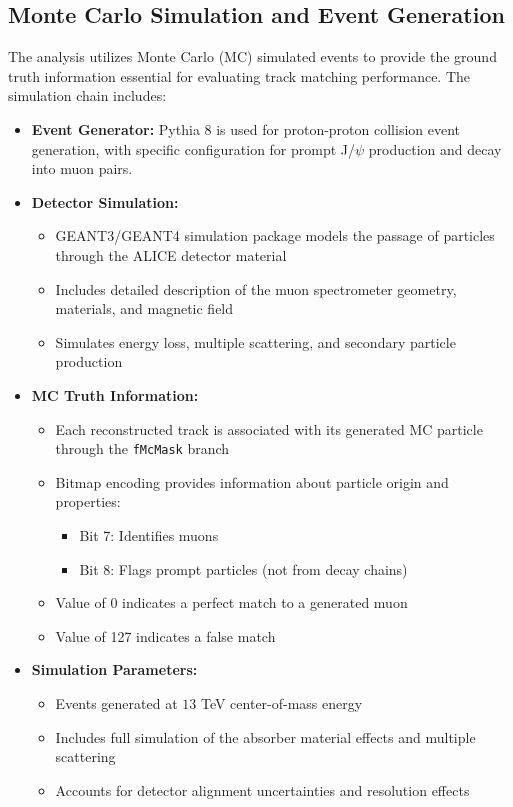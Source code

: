 \documentclass{article}
\begin{document}
\subsection{Monte Carlo Simulation and Event Generation}
The analysis utilizes Monte Carlo (MC) simulated events to provide the ground truth information essential for evaluating track matching performance. The simulation chain includes:

\begin{itemize}
    \item \textbf{Event Generator:} Pythia 8 is used for proton-proton collision event generation, with specific configuration for prompt J/$\psi$ production and decay into muon pairs.
    
    \item \textbf{Detector Simulation:}
    \begin{itemize}
        \item GEANT3/GEANT4 simulation package models the passage of particles through the ALICE detector material
        \item Includes detailed description of the muon spectrometer geometry, materials, and magnetic field
        \item Simulates energy loss, multiple scattering, and secondary particle production
    \end{itemize}
    
    \item \textbf{MC Truth Information:}
    \begin{itemize}
        \item Each reconstructed track is associated with its generated MC particle through the \texttt{fMcMask} branch
        \item Bitmap encoding provides information about particle origin and properties:
        \begin{itemize}
            \item Bit 7: Identifies muons
            \item Bit 8: Flags prompt particles (not from decay chains)
        \end{itemize}
        \item Value of 0 indicates a perfect match to a generated muon
        \item Value of 127 indicates a false match
    \end{itemize}
    
    \item \textbf{Simulation Parameters:}
    \begin{itemize}
        \item Events generated at $13$ TeV center-of-mass energy
        \item Includes full simulation of the absorber material effects and multiple scattering
        \item Accounts for detector alignment uncertainties and resolution effects
    \end{itemize}
\end{itemize}
\end{document}
